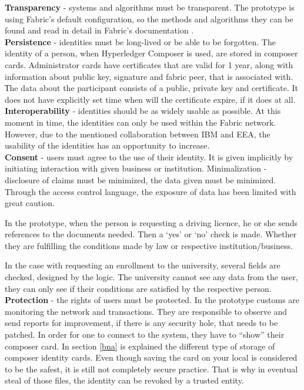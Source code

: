 \documentclass[a4paper,11pt]{report}
\begin{document}
\textbf{Transparency}  - systems and algorithms must be transparent. The prototype is using Fabric’s default configuration, so the methods and algorithms they can be found and read in detail in Fabric’s documentation \cite{fabricca}.
\\

\textbf{Persistence} - identities must be long-lived or be able to be forgotten. The identity of a person, when Hyperledger Composer is used, are stored in composer cards. Administrator cards have certificates that are valid for 1 year, along with information about public key, signature and fabric peer, that is associated with. 
Тhe data about the participant consists of a public, private key and certificate. It does not have explicitly set time when will the certificate expire, if it does at all. 
\\

\textbf{Interoperability} - identities should be as widely usable as possible. At this moment in time, the identities can only be used within the Fabric network. However, due to the mentioned collaboration between IBM and EEA, the usability of the identities has an opportunity to increase.  
\\

\textbf{Consent} - users must agree to the use of their identity. It is given implicitly by initiating interaction with given business or institution. 
Minimalization - disclosure of claims must be minimized, the data given must be minimized. Through the access control language, the exposure of data has been limited with great caution.
 
In the prototype, when the person is requesting a driving licence, he or she sends references to the documents needed. Then a ‘yes’ or ‘no’ check is made. Whether they are fulfilling the conditions made by law or respective institution/business. 

In the case with requesting an enrollment to the university, several fields are checked, designed by the logic. The university cannot see any data from the user, they can only see if their conditions are satisfied by the respective person. 
\\

\textbf{Protection} - the rights of users must be protected. In the prototype customs are monitoring the network and transactions. They are responsible to observe and send reports for improvement, if there is any security hole, that needs to be patched. 
In order for one to connect to the system, they have to “show” their composer card. In section \ref{bna} is explained the different type of storage of composer identity cards. Even though saving the card on your local is considered to be the safest, it is still not completely secure practice. That is why in eventual steal of those files, the identity can be revoked by a trusted entity. 
\end{document}
